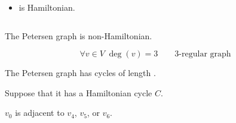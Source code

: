 \begin{frame}{}
  \begin{theorem}{}
    \begin{itemize}
      \item {} is  Hamiltonian.
        \begin{center}
        \end{center}
    \end{itemize}
  \end{theorem}

  \pause
  \begin{columns}
      \pause
      \pause
      \pause
  \end{columns}
\end{frame}

\begin{frame}{}
  \begin{theorem}{}
    The Petersen graph is non-Hamiltonian.
  \end{theorem}


  \pause
  \vspace{-0.50cm}
  \[
    \forall v \in V\; \deg(v) = 3 \qquad \text{3-regular graph}
  \]
  \begin{center}
    The Petersen graph has  cycles of length .
  \end{center}
\end{frame}

\begin{frame}{}
  \begin{center}

    \pause
    \vspace{0.30cm}
    Suppose that it has a Hamiltonian cycle $C$.


    \pause
    $v_{0}$ is adjacent to $v_{4}$, $v_{5}$, or $v_{6}$.
  \end{center}
\end{frame}

